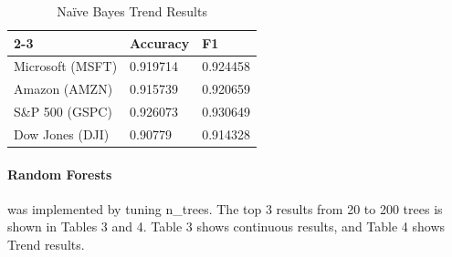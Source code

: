 \documentclass[11pt]{article}
\begin{document}
				\begin{table}[h]
					\centering
					\begin{tabular}{l|l|l|}
						\cline{2-3}
						& Accuracy & F1       \\ \hline
						\multicolumn{1}{|l|}{Microsoft (MSFT)} & 0.919714 & 0.924458 \\ \hline
						\multicolumn{1}{|l|}{Amazon (AMZN)}    & 0.915739 & 0.920659 \\ \hline
						\multicolumn{1}{|l|}{S\&P 500 (GSPC)}  & 0.926073 & 0.930649 \\ \hline
						\multicolumn{1}{|l|}{Dow Jones (DJI)}  & 0.90779  & 0.914328 \\ \hline
					\end{tabular}
					\caption{Naïve Bayes Trend Results}
				\end{table}
			 
				\paragraph{Random Forests} was implemented by tuning n\_trees. The top 3 results from 20 to 200 trees is shown in Tables 3 and 4. Table 3 shows continuous results, and Table 4 shows Trend results.
			
\end{document}
